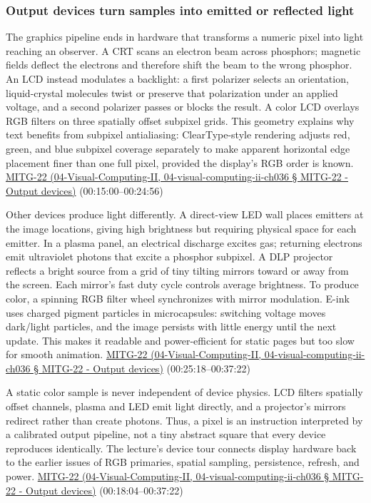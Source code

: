 \subsubsection{Output devices turn samples into emitted or reflected light}\label{output-devices-turn-samples-into-emitted-or-reflected-light}

The graphics pipeline ends in hardware that transforms a numeric pixel into light reaching an observer. A CRT scans an electron beam across phosphors; magnetic fields deflect the electrons and therefore shift the beam to the wrong phosphor. An LCD instead modulates a backlight: a first polarizer selects an orientation, liquid-crystal molecules twist or preserve that polarization under an applied voltage, and a second polarizer passes or blocks the result. A color LCD overlays RGB filters on three spatially offset subpixel grids. This geometry explains why text benefits from subpixel antialiasing: ClearType-style rendering adjusts red, green, and blue subpixel coverage separately to make apparent horizontal edge placement finer than one full pixel, provided the display's RGB order is known. \href{}{MITG-22 (04-Visual-Computing-II, 04-visual-computing-ii-ch036 § MITG-22 - Output devices)} (00:15:00--00:24:56)

Other devices produce light differently. A direct-view LED wall places emitters at the image locations, giving high brightness but requiring physical space for each emitter. In a plasma panel, an electrical discharge excites gas; returning electrons emit ultraviolet photons that excite a phosphor subpixel. A DLP projector reflects a bright source from a grid of tiny tilting mirrors toward or away from the screen. Each mirror's fast duty cycle controls average brightness. To produce color, a spinning RGB filter wheel synchronizes with mirror modulation. E-ink uses charged pigment particles in microcapsules: switching voltage moves dark/light particles, and the image persists with little energy until the next update. This makes it readable and power-efficient for static pages but too slow for smooth animation. \href{}{MITG-22 (04-Visual-Computing-II, 04-visual-computing-ii-ch036 § MITG-22 - Output devices)} (00:25:18--00:37:22)

A static color sample is never independent of device physics. LCD filters spatially offset channels, plasma and LED emit light directly, and a projector's mirrors redirect rather than create photons. Thus, a pixel is an instruction interpreted by a calibrated output pipeline, not a tiny abstract square that every device reproduces identically. The lecture's device tour connects display hardware back to the earlier issues of RGB primaries, spatial sampling, persistence, refresh, and power. \href{}{MITG-22 (04-Visual-Computing-II, 04-visual-computing-ii-ch036 § MITG-22 - Output devices)} (00:18:04--00:37:22)

